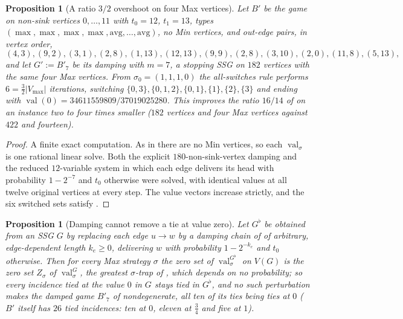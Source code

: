 \documentclass[11pt]{article}
\theoremstyle{plain}
\newtheorem{proposition}[theorem]{Proposition}
\theoremstyle{definition}
\DeclareMathOperator{\val}{val}
\newcommand{\Vmax}{V_{\max}}
\begin{document}
\begin{proposition}[A ratio $3/2$ overshoot on four Max
vertices]\label{prop:overshoot-small}
Let $B'$ be the game on non-sink vertices $0,\dots,11$ with $t_0=12$,
$t_1=13$, types $(\max,\max,\max,\max,\mathrm{avg},\dots,\mathrm{avg})$,
no Min vertices, and out-edge pairs, in vertex order,
\[
 (4,3),(9,2),(3,1),(2,8),(1,13),(12,13),(9,9),(2,8),(3,10),(2,0),(11,8),(5,13),
\]
and let $G':=B'_7$ be its damping with $m=7$, a stopping SSG on $182$
vertices with the same four Max vertices. From
$\sigma_0=(1,1,1,0)$ the all-switches rule performs $6=\tfrac32|\Vmax|$
iterations, switching $\{0,3\},\{0,1,2\},\{0,1\},\{1\},\{2\},\{3\}$ and
ending with $\val(0)=34611559809/37019025280$. This improves the ratio
$16/14$ of  on an instance two to four
times smaller ($182$ vertices and four Max vertices against $422$ and
fourteen).
\end{proposition}

\begin{proof}
A finite exact computation. As in  there
are no Min vertices, so each $\val_\sigma$ is one rational linear solve.
Both the explicit $180$-non-sink-vertex damping and the reduced
$12$-variable system in which each edge delivers its head with
probability $1-2^{-7}$ and $t_0$ otherwise were solved, with identical
values at all twelve original vertices at every step. The value vectors
increase strictly, and the six switched sets satisfy
.
\end{proof}
\begin{proposition}[Damping cannot remove a tie at value zero]\label{prop:zero-ties}
Let $G^{\flat}$ be obtained from an SSG $G$ by replacing each edge $u\to w$
by a damping chain of  of arbitrary, edge-dependent
length $k_e\ge0$, delivering $w$ with probability $1-2^{-k_e}$ and $t_0$
otherwise. Then for every Max strategy $\sigma$ the zero set of
$\val^{G^{\flat}}_\sigma$ on $V(G)$ is the zero set $Z_\sigma$ of
$\val^{G}_\sigma$, the greatest $\sigma$-trap of , which
depends on no probability; so every incidence tied at the value $0$ in
$G$ stays tied in $G^{\flat}$, and no such perturbation makes the damped
game $B'_7$ of  nondegenerate, all ten of its
ties being ties at $0$ ($B'$ itself has $26$ tied incidences: ten at $0$,
eleven at $\tfrac34$ and five at $1$).
\end{proposition}
\end{document}
